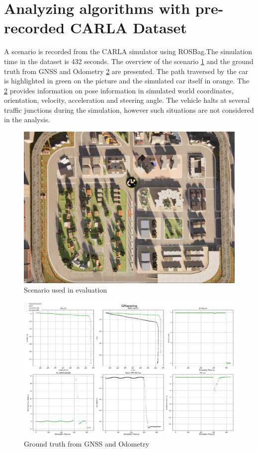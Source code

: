 \section{Analyzing algorithms with pre-recorded CARLA Dataset}
A scenario is recorded from the CARLA simulator using ROSBag.The simulation time in the dataset is  432 seconds. The overview of the scenario \ref{fig:Scenario} and the ground truth from GNSS and Odometry \ref{fig:GT_param} are presented. The path traversed by the car is highlighted in green on the picture and the simulated car itself in orange. The \ref{fig:GT_param} provides information on pose information in simulated world coordinates, orientation, velocity, acceleration and steering angle. The vehicle halts at several traffic junctions during the simulation, however such situations are not considered in the analysis.
    \begin{figure}[h] 
        \includegraphics[height=0.6\textwidth]{images/Scenario.png}
        \caption{Scenario used in evaluation}
        \label{fig:Scenario}
    \end{figure}
    \begin{figure}[h] 
        \includegraphics[height=0.6\textwidth]{images/GroundTruthParameters.png}
        \caption{Ground truth from GNSS and Odometry}
        \label{fig:GT_param}
    \end{figure}
